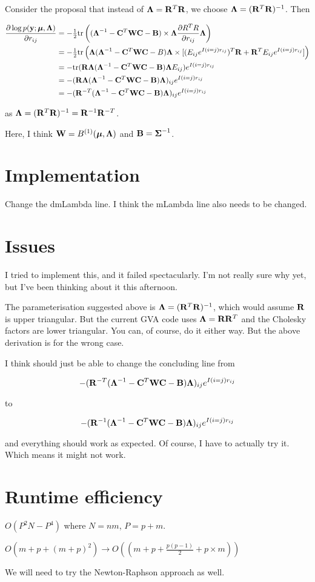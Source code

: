 \documentclass{article}[12pt]
\begin{document}
Consider the proposal that instead of ${\boldsymbol \Lambda} = {\bf R}^T {\bf R}$, we choose
${\boldsymbol \Lambda} = ({\bf R}^T {\bf R})^{-1}$. Then

\begin{align*}
\frac{\partial \log p({\bf y}; {\boldsymbol \mu}, {\boldsymbol \Lambda})}{\partial r_{ij}} &= - \tfrac{1}{2} \text{tr} \left( ({\boldsymbol \Lambda}^{-1} - {\bf C}^T {\bf W} {\bf C} - {\bf B}) \times {\boldsymbol\Lambda} \frac{\partial R^T R}{\partial r_{ij}} {\boldsymbol \Lambda} \right) \\
&= - \tfrac{1}{2} \text{tr} \left( {\boldsymbol \Lambda}({\boldsymbol \Lambda}^{-1} - {\bf C}^T{\bf W}{\bf C} - B){\boldsymbol \Lambda} \times [(E_{ij} e^{I(i=j)r_{ij}})^T {\bf R} + {\bf R}^T E_{ij} e^{I(i=j) r_{ij}}] \right) \\
&= - \text{tr} ({\bf R} {\boldsymbol \Lambda} ({\boldsymbol \Lambda}^{-1} - {\bf C}^T {\bf W} {\bf C} - {\bf B}) {\boldsymbol \Lambda} E_{ij})e^{I(i=j) r_{ij}} \\
&= - ({\bf R} {\boldsymbol \Lambda} ({\boldsymbol \Lambda}^{-1} - {\bf C}^T {\bf W} {\bf C} - {\bf B}) {\boldsymbol \Lambda})_{ij} e^{I(i=j) r_{ij}} \\
&= - ({\bf R}^{-T} ({\boldsymbol \Lambda}^{-1} - {\bf C}^T {\bf W} {\bf C} - {\bf B}) {\boldsymbol \Lambda})_{ij} e^{I(i=j) r_{ij}}
\end{align*}

as ${\boldsymbol \Lambda} = ({\bf R}^T {\bf R})^{-1} = {\bf R}^{-1} {\bf R}^{-T}$.

Here, I think ${\bf W} = B^{(1)}({\boldsymbol \mu}, {\boldsymbol \Lambda})$ and ${\bf B} = {\boldsymbol \Sigma}^{-1}$.

\section{Implementation}
Change the dmLambda line. I think the mLambda line also needs to be
changed.

\section{Issues}
I tried to implement this, and it failed spectacularly. I'm not really
sure why yet, but I've been thinking about it this afternoon.

The parameterisation suggested above is ${\boldsymbol \Lambda} = ({\bf R}^T{\bf R})^{-1}$,
which would assume ${\bf R}$ is upper triangular. But the current GVA
code uses ${\boldsymbol \Lambda} = {\bf R} {\bf R}^T$ and the Cholesky factors are lower
triangular. You can, of course, do it either way. But the above
derivation is for the wrong case.

I think should just be able to change the concluding line from

$$
- ({\bf R}^{-T} ({\boldsymbol \Lambda}^{-1} - {\bf C}^T {\bf W} {\bf C} - {\bf B}) {\boldsymbol \Lambda})_{ij} e^{I(i=j) r_{ij}}
$$

\noindent to

$$
- ({\bf R}^{-1} ({\boldsymbol \Lambda}^{-1} - {\bf C}^T {\bf W} {\bf C} - {\bf B}) {\boldsymbol \Lambda})_{ij} e^{I(i=j) r_{ij}}
$$

\noindent and everything should work as expected. Of course, I have to actually try it.
Which means it might not work.

\section{Runtime efficiency}
$O(P^2 N - P^4)$ where $N=nm$, $P=p+m$.

\noindent $O(m + p + (m+p)^2) \to O((m + p + \frac{p(p-1)}{2} + p \times m))$

\noindent We will need to try the Newton-Raphson approach as well.
\end{document}
